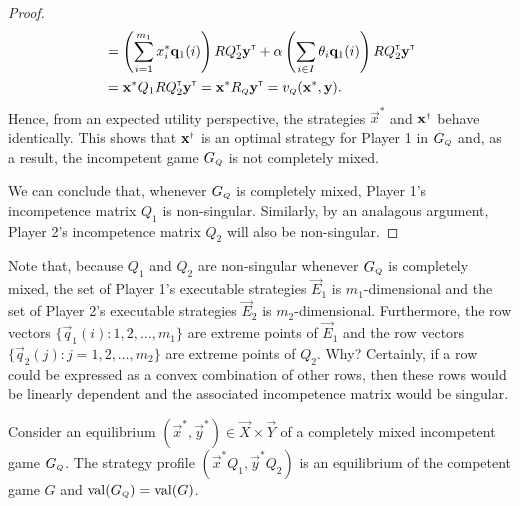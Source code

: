 \begin{proof}
\begin{equation}
\begin{split}
                & = \left(\sum_{i = 1}^{m_1} x^*_i \vec{q}_1(i)\right) R Q_2^\transp \vec{y}^\transp + \alpha \left(\sum_{i \in I}  \theta_i \vec{q}_1(i)\right) R Q_2^\transp \vec{y}^\transp \\
                & = \vec{x}^* Q_1 R Q_2^\transp \vec{y}^\transp
                = \vec{x}^* R_\ms{Q} \vec{y}^\transp
                = v_\ms{Q}(\vec{x}^*, \vec{y}).
        \end{split}
        \end{equation}
        Hence, from an expected utility perspective, the strategies $\vec{x}^*$ and $\vec{x}^\sdagger$ behave identically.
        This shows that $\vec{x}^\sdagger$ is an optimal strategy for Player 1 in $G_\ms{Q}$ and, as a result, the incompetent game $G_\ms{Q}$ is not completely mixed.

        We can conclude that, whenever $G_\ms{Q}$ is completely mixed, Player 1's incompetence matrix $Q_1$ is non-singular.
        Similarly, by an analagous argument, Player 2's incompetence matrix $Q_2$ will also be non-singular.
    \end{proof}

    Note that, because $Q_1$ and $Q_2$ are non-singular whenever $G_\ms{Q}$ is completely mixed, the set of Player 1's executable strategies $\vec{E}_1$ is $m_1$-dimensional and the set of Player 2's executable strategies $\vec{E}_2$ is $m_2$-dimensional.
    Furthermore, the row vectors $\{\vec{q}_1(i) : 1, 2, \ldots, m_1\}$ are extreme points of $\vec{E}_1$ and the row vectors $\{\vec{q}_2(j) : j = 1, 2, \ldots, m_2\}$ are extreme points of $Q_2$.
    Why?
    Certainly, if a row could be expressed as a convex combination of other rows, then these rows would be linearly dependent and the associated incompetence matrix would be singular.

    \begin{theorem} \label{thm:competent-game-equilibrium}
        Consider an equilibrium $(\vec{x}^*, \vec{y}^*) \in \vec{X} \times \vec{Y}$ of a completely mixed incompetent game $G_\ms{Q}$.
        The strategy profile $(\vec{x}^* Q_1, \vec{y}^* Q_2)$ is an equilibrium of the competent game $G$ and $\val(G_\ms{Q}) = \val(G)$.
    \end{theorem}

